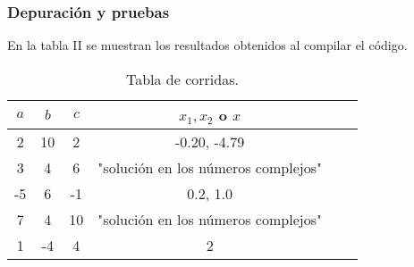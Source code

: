 \subsubsection{Depuración y pruebas}
En la tabla II se muestran los resultados obtenidos al compilar el código.
\vspace{0.8cm}
\begin{table}[!ht]
\label{T:equipos}
\begin{center}
\begin{tabular}{| c | c | c | c | c | c |}
\hline
\textbf{$a$} & \textbf{$b$} & \textbf{$c$} & \textbf{$x_1,x_2$ o $x$}\\
\hline
2 & 10 & 2 & -0.20, -4.79 \\
3 & 4 & 6 & "solución en los números complejos" \\
-5 & 6 & -1 & 0.2,  1.0 \\
7 & 4 & 10 & "solución en los números complejos" \\
1 & -4 & 4 & 2 \\
\hline
\end{tabular}
\caption{Tabla de corridas.}
\end{center}
\end{table}\\